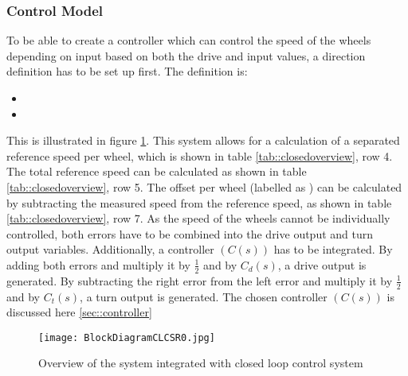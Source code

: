 \subsubsection{Control Model}
To be able to create a controller which can control the speed of the wheels depending on input based on both the drive and input values, a direction definition has to be set up first.
The definition is:
\begin{itemize}
\item {}
\item {}
\end{itemize}
This is illustrated in figure \ref{fig::controldiagram}.
This system allows for a calculation of a separated reference speed per wheel, which is shown in table \ref{tab::closedoverview}, row 4.
The total reference speed can be calculated as shown in table \ref{tab::closedoverview}, row 5.
The offset per wheel (labelled as ) can be calculated by subtracting the measured speed from the reference speed, as shown in table \ref{tab::closedoverview}, row 7.
As the speed of the wheels cannot be individually controlled, both errors have to be combined into the drive output and turn output variables.
Additionally, a controller $(C(s))$ has to be integrated.
By adding both errors and multiply it by $ \frac{1}{2} $ and by $C_d(s)$, a drive output is generated. By subtracting the right error from the left error and multiply it by $ \frac{1}{2} $ and by $C_t(s)$, a turn output is generated. The chosen controller $(C(s))$ is discussed here \ref{sec::controller}

\begin{figure}[H]
\centering
\texttt{[image: BlockDiagramCLCSR0.jpg]}
\caption{Overview of the system integrated with closed loop control system}
\label{fig::controldiagram}
\end{figure}


